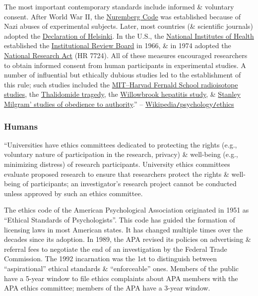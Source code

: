 \documentclass[oneside]{book}
\numberwithin{equation}{section}
\begin{document}
The most important contemporary standards include informed \& voluntary consent. After World War II, the \href{https://en.wikipedia.org/wiki/Nuremberg_Code}{Nuremberg Code} was established because of Nazi abuses of experimental subjects. Later, most countries (\& scientific journals) adopted the \href{https://en.wikipedia.org/wiki/Declaration_of_Helsinki}{Declaration of Helsinki}. In the U.S., the \href{https://en.wikipedia.org/wiki/National_Institutes_of_Health}{National Institutes of Health} established the \href{https://en.wikipedia.org/wiki/Institutional_Review_Board}{Institutional Review Board} in 1966, \& in 1974 adopted the \href{https://en.wikipedia.org/wiki/National_Research_Act}{National Research Act} (HR 7724). All of these measures encouraged researchers to obtain informed consent from human participants in experimental studies. A number of influential but ethically dubious studies led to the establishment of this rule; such studies included the \href{https://en.wikipedia.org/wiki/Walter_E._Fernald_Developmental_Center#Nuclear_medicine_research_in_children}{MIT--Harvad Fernald School radioisotope studies}, the \href{https://en.wikipedia.org/wiki/Thalidomide_scandal}{Thalidomide tragedy}, the \href{https://en.wikipedia.org/wiki/Hepatitis#Willowbrook_State_School_experiments}{Willowbrook hepatitis study}, \& \href{https://en.wikipedia.org/wiki/Milgram_experiment}{Stanley Milgram' studies of obedience to authority}.'' -- \href{https://en.wikipedia.org/wiki/Psychology#Ethics}{Wikipedia\texttt{/}psychology\texttt{/}ethics}

\subsubsection{Humans}
``Universities have ethics committees dedicated to protecting the rights (e.g., voluntary nature of participation in the research, privacy) \& well-being (e.g., minimizing distress) of research participants. University ethics committees evaluate proposed research to ensure that researchers protect the rights \& well-being of participants; an investigator's research project cannot be conducted unless approved by such an ethics committee.

The ethics code of the American Psychological Association originated in 1951 as ``Ethical Standards of Psychologists''. This code has guided the formation of licensing laws in most American states. It has changed multiple times over the decades since its adoption. In 1989, the APA revised its policies on advertising \& referral fees to negotiate the end of an investigation by the Federal Trade Commission. The 1992 incarnation was the 1st to distinguish between ``aspirational'' ethical standards \& ``enforceable'' ones. Members of the public have a 5-year window to file ethics complaints about APA members with the APA ethics committee; members of the APA have a 3-year window.
\end{document}
